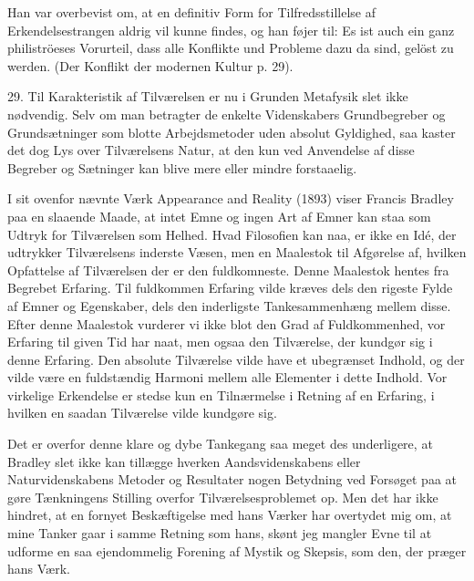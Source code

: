 \documentclass[12pt]{article}
\newcommand{\apage}[1]{\marginnote{\footnotesize\textit{[#1]}}}
\begin{document}
       Han
\setcounter{footnote}{0}%
\apage{95}var overbevist om, at en definitiv Form for Tilfredsstillelse af
Erkendelsestrangen aldrig vil kunne findes, og han føjer til:
\guillemotright{}Es ist auch ein ganz philiströeses Vorurteil, dass alle
Konflikte und Probleme dazu da sind, gelöst zu werden.\guillemotleft{} (Der
Konflikt der modernen Kultur p. 29).

29. Til Karakteristik af Tilværelsen er nu i Grunden Metafysik slet ikke
nødvendig. Selv om man betragter de enkelte Videnskabers Grundbegreber og
Grundsætninger som blotte Arbejdsmetoder uden absolut Gyldighed, saa kaster det
dog Lys over Tilværelsens Natur, at den kun ved Anvendelse af disse Begreber og
Sætninger kan blive mere eller mindre forstaaelig.

I sit ovenfor nævnte Værk \guillemotright{}Appearance and
Reality\guillemotleft{} (1893) viser Francis Bradley paa en slaaende Maade, at
intet Emne og ingen Art af Emner kan staa som Udtryk for Tilværelsen som
Helhed. Hvad Filosofien kan naa, er ikke en Idé, der udtrykker Tilværelsens
inderste Væsen, men en Maalestok til Afgørelse af, hvilken Opfattelse af
Tilværelsen der er den fuldkomneste. Denne Maalestok hentes fra Begrebet
Erfaring. Til fuldkommen Erfaring vilde kræves dels den rigeste Fylde af Emner
og Egenskaber, dels den inderligste Tankesammenhæng mellem disse. Efter denne
Maalestok vurderer vi ikke blot den Grad af Fuldkommenhed, vor Erfaring til
given Tid har naat, men ogsaa den Tilværelse, der kundgør sig i denne Erfaring.
Den absolute Tilværelse vilde have et ubegrænset Indhold, og der vilde være en
fuldstændig Harmoni mellem alle Elementer i dette Indhold. Vor virkelige
Erkendelse er stedse kun en Tilnærmelse i Retning af en Erfaring, i hvilken en
saadan Tilværelse vilde kundgøre sig.

Det er overfor denne klare og dybe Tankegang saa
\setcounter{footnote}{0}%
\apage{96}meget des underligere, at Bradley slet ikke kan tillægge hverken
Aandsvidenskabens eller Naturvidenskabens Metoder og Resultater nogen Betydning
ved Forsøget paa at gøre Tænkningens Stilling overfor Tilværelsesproblemet op.
Men det har ikke hindret, at en fornyet Beskæftigelse med hans Værker har
overtydet mig om, at mine Tanker gaar i samme Retning som hans, skønt jeg
mangler Evne til at udforme en saa ejendommelig Forening af Mystik og Skepsis,
som den, der præger hans Værk.
\end{document}
